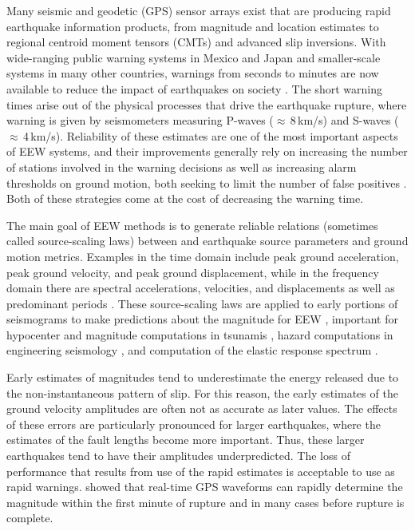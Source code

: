 \documentclass[preprint, aps, showpacs]{revtex4-1}
\begin{document}
Many seismic and geodetic (GPS) sensor arrays exist that are producing rapid earthquake information products, from magnitude and location estimates to regional centroid moment tensors (CMTs) and advanced slip inversions.
With wide-ranging public warning systems in Mexico and Japan and smaller-scale systems in many other countries, warnings from seconds to minutes are now available to reduce the impact of earthquakes on society \cite{StAl2016}.
The short warning times arise out of the physical processes that drive the earthquake rupture, where warning is given by seismometers measuring P-waves ($\approx$\,8\,km/s) and S-waves ($\approx$\,4\,km/s).
Reliability of these estimates are one of the most important aspects of EEW systems, and their improvements generally rely on increasing the number of stations involved in the warning decisions as well as increasing alarm thresholds on ground motion, both seeking to limit the number of false positives \cite{KuCo2015}. Both of these strategies come at the cost of decreasing the warning time.

The main goal of EEW methods is to generate reliable relations (sometimes called source-scaling laws) between and earthquake source parameters and ground motion metrics. Examples in the time domain include peak ground acceleration, peak ground velocity, and peak
ground displacement, while in the frequency domain there are spectral accelerations, velocities, and displacements as well as predominant periods \cite{Do2003}. These source-scaling laws are applied to early portions of seismograms to make predictions about the magnitude for EEW \cite{AlGa2009}, important for hypocenter and magnitude computations in tsunamis \cite{MeCr2015}, hazard computations in engineering seismology \cite{PaMu2012}, and computation of the elastic response spectrum \cite{Ch2007}.

Early estimates of magnitudes tend to underestimate the energy released due to the non-instantaneous pattern of slip.
For this reason, the early estimates of the ground velocity amplitudes are often not as accurate as later values. 
The effects of these errors are particularly pronounced for larger earthquakes, where the estimates of the fault lengths become more important.
Thus, these larger earthquakes tend to have their amplitudes underpredicted.
The loss of performance that results from use of the rapid estimates is acceptable to use as rapid warnings.
\cite{MeCr2015} showed that real-time GPS waveforms can rapidly determine the magnitude within the first minute of rupture and in many cases before rupture is complete.
\end{document}

